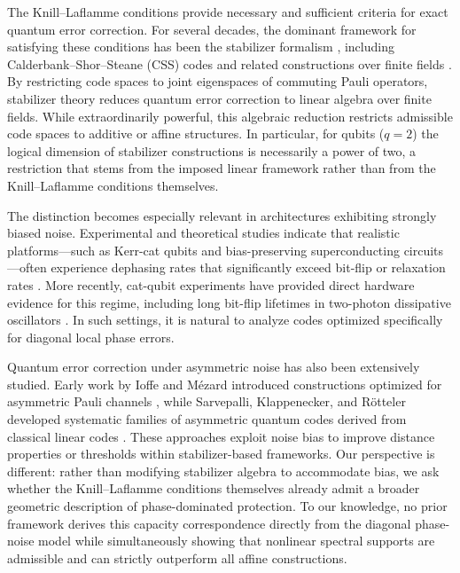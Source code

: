 \documentclass[a4paper,twocolumn,11pt,allowtoday]{quantumarticle}
\theoremstyle{plain}
\theoremstyle{definition}
\theoremstyle{remark}
\begin{document}
The Knill–Laflamme conditions \cite{KnillLaflamme1997} provide necessary and sufficient criteria for exact quantum error correction. For several decades, the dominant framework for satisfying these conditions has been the stabilizer formalism \cite{Gottesman1997}, including Calderbank–Shor–Steane (CSS) codes \cite{CalderbankShor1996,Steane1996} and related constructions over finite fields \cite{CRSS1998}. By restricting code spaces to joint eigenspaces of commuting Pauli operators, stabilizer theory reduces quantum error correction to linear algebra over finite fields. While extraordinarily powerful, this algebraic reduction restricts admissible code spaces to additive or affine structures. In particular, for qubits ($q=2$) the logical dimension of stabilizer constructions is necessarily a power of two, a restriction that stems from the imposed linear framework rather than from the Knill–Laflamme conditions themselves.

The distinction becomes especially relevant in architectures exhibiting strongly biased noise. Experimental and theoretical studies indicate that realistic platforms---such as Kerr-cat qubits and bias-preserving superconducting circuits---often experience dephasing rates that significantly exceed bit-flip or relaxation rates \cite{AliferisPreskill2008,Tuckett2018,GuillaudMirrahimi2019}. More recently, cat-qubit experiments have provided direct hardware evidence for this regime, including long bit-flip lifetimes in two-photon dissipative oscillators \cite{Berdou2023}. In such settings, it is natural to analyze codes optimized specifically for diagonal local phase errors.

Quantum error correction under asymmetric noise has also been extensively studied. Early work by Ioffe and M{\'e}zard introduced constructions optimized for asymmetric Pauli channels \cite{IoffeMezard2007}, while Sarvepalli, Klappenecker, and R\"otteler developed systematic families of asymmetric quantum codes derived from classical linear codes \cite{Sarvepalli2009}. These approaches exploit noise bias to improve distance properties or thresholds within stabilizer-based frameworks. Our perspective is different: rather than modifying stabilizer algebra to accommodate bias, we ask whether the Knill--Laflamme conditions themselves already admit a broader geometric description of phase-dominated protection. To our knowledge, no prior framework derives this capacity correspondence directly from the diagonal phase-noise model while simultaneously showing that nonlinear spectral supports are admissible and can strictly outperform all affine constructions.
\end{document}
